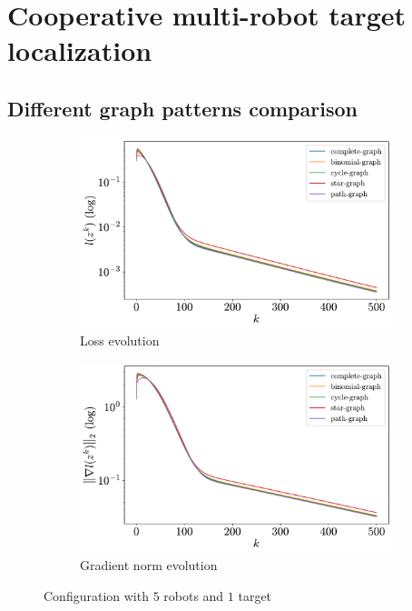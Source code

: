 \documentclass[a4paper,11pt,oneside]{book}
\begin{document}
\section{Cooperative multi-robot target localization}

\subsection{Different graph patterns comparison}

\begin{figure}[H]
      \centering
      \begin{subfigure}[t]{0.49\textwidth}
            \centering
            \includegraphics[width=\linewidth]{./figs/tracking/loss_5_1_2_500.pdf} 
            \caption{Loss evolution}
      \end{subfigure}
      \hfill
      \begin{subfigure}[t]{0.49\textwidth}
            \centering
            \includegraphics[width=\linewidth]{./figs/tracking/gradient_5_1_2_500.pdf} 
            \caption{Gradient norm evolution}
      \end{subfigure}
      \caption{Configuration with $5$ robots and $1$ target}
\end{figure}
\end{document}
